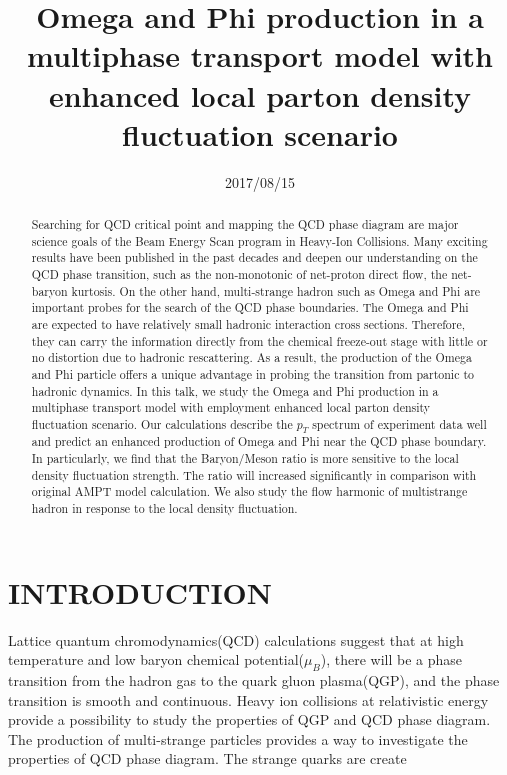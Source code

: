\documentclass[11pt,a4paper,openany]{article}
\begin{document}
\title{Omega and Phi production in a multiphase transport model with enhanced local parton density fluctuation scenario}
\date{2017/08/15}
\maketitle

\begin{abstract}
  Searching for QCD critical point and mapping the QCD phase diagram are major science goals of the
  Beam Energy Scan program in Heavy-Ion Collisions. Many exciting results have been published in the
  past decades and deepen our understanding on the QCD phase transition, such as the non-monotonic of
  net-proton direct flow, the net-baryon kurtosis. On the other hand, multi-strange hadron such as
  Omega and Phi are important probes for the search of the QCD phase boundaries. The Omega and Phi
  are expected to have relatively small hadronic interaction cross sections. Therefore, they can
  carry the information directly from the chemical freeze-out stage with little or no distortion due
  to hadronic rescattering. As a result, the production of the Omega and Phi particle offers a unique
  advantage in probing the transition from partonic to hadronic dynamics.  In this talk, we study the
  Omega and Phi production in a multiphase transport model with employment enhanced local parton
  density fluctuation scenario. Our calculations describe the $p_{T}$ spectrum of experiment data
  well and predict an enhanced production of Omega and Phi near the QCD phase boundary. In
  particularly, we find that the Baryon/Meson ratio is more sensitive to the local density
  fluctuation strength. The ratio will increased significantly in comparison with original AMPT
  model calculation. We also study the flow harmonic of multistrange hadron in response to the local
  density fluctuation.
\end{abstract}

\section{INTRODUCTION}
Lattice quantum chromodynamics(QCD) calculations suggest that at high temperature and low baryon
chemical potential($\mu_{B}$), there will be a phase transition from the hadron gas to the quark
gluon plasma(QGP), and the phase transition is smooth and continuous. Heavy ion collisions at
relativistic energy provide a possibility to study the properties of QGP and QCD phase diagram.
The production of multi-strange particles provides a way to investigate the properties of QCD phase
diagram. The strange quarks are create
\end{document}
